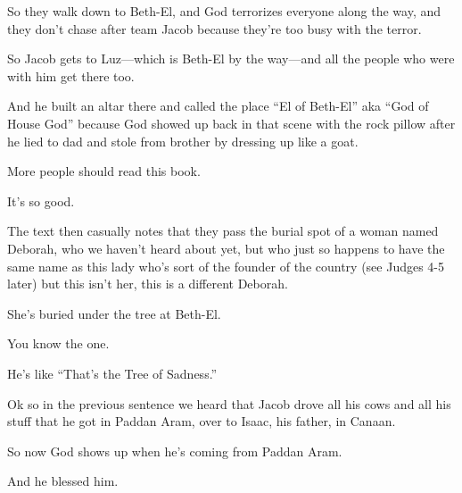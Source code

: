 {
}
{
}
{
	So they walk down to Beth-El, and God terrorizes everyone along
	the way, and they don't chase after team Jacob because they're
	too busy with the terror.
}

{
}
{
}
{
	So Jacob gets to Luz—which is Beth-El by the way—and all the
	people who were with him get there too.
}

{
}
{
}
{
	And he built an altar there and called the place ``El of Beth-El''
	aka ``God of House God'' because God showed up back in that scene
	with the rock pillow after he lied to dad and stole from brother
	by dressing up like a goat.

	More people should read this book.

	It's so good.
}

{
}
{
}
{
	The text then casually notes that they pass the burial spot
	of a woman named Deborah, who we haven't heard about yet,
	but who just so happens to have the same name as this lady
	who's sort of the founder of the country (see Judges 4-5 later)
	but this isn't her, this is a different Deborah.

	She's buried under the tree at Beth-El.
	
	You know the one.

	He's like ``That's the Tree of Sadness.''
}

{
}
{
}
{
	Ok so in the previous sentence we heard that Jacob drove all his cows
	and all his stuff that he got in Paddan Aram, over to Isaac, his father,
	in Canaan.

	So now God shows up  when he's coming from Paddan Aram.

	And he blessed him.
}

